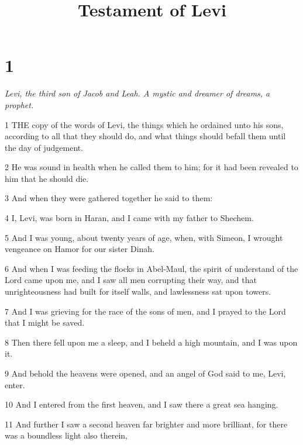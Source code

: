 

\title{Testament of Levi}

\chapter{1}

\par \textit{Levi, the third son of Jacob and Leah. A mystic and dreamer of dreams, a prophet.}

\par 1 THE copy of the words of Levi, the things which he ordained unto his sons, according to all that they should do, and what things should befall them until the day of judgement.

\par 2 He was sound in health when he called them to him; for it had been revealed to him that he should die.

\par 3 And when they were gathered together he said to them:

\par 4 I, Levi, was born in Haran, and I came with my father to Shechem.

\par 5 And I was young, about twenty years of age, when, with Simeon, I wrought vengeance on Hamor for our sister Dinah.

\par 6 And when I was feeding the flocks in Abel-Maul, the spirit of understand of the Lord came upon me, and I saw all men corrupting their way, and that unrighteousness had built for itself walls, and lawlessness sat upon towers.

\par 7 And I was grieving for the race of the sons of men, and I prayed to the Lord that I might be saved.

\par 8 Then there fell upon me a sleep, and I beheld a high mountain, and I was upon it.

\par 9 And behold the heavens were opened, and an angel of God said to me, Levi, enter.

\par 10 And I entered from the first heaven, and I saw there a great sea hanging.

\par 11 And further I saw a second heaven far brighter and more brilliant, for there was a boundless light also therein,

